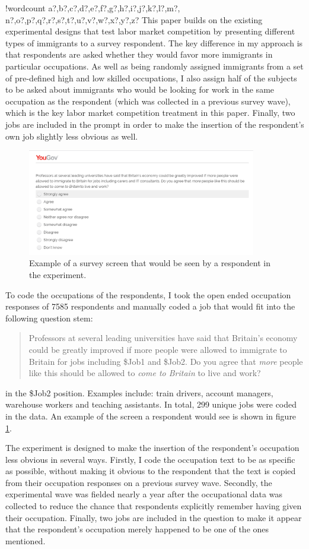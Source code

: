 \documentclass{article}\usepackage[]{graphicx}\usepackage[]{color}
\newcounter{words}
\newenvironment{counted}{%
\setcounter{words}{0}
\SearchList!{wordcount}{\stepcounter{words}}
{a?,b?,c?,d?,e?,f?,g?,h?,i?,j?,k?,l?,m?,
n?,o?,p?,q?,r?,s?,t?,u?,v?,w?,x?,y?,z?}
\UndoBoundary{'}
\SearchOrder{p;}}{%
\StopSearching}
\begin{document}
\begin{counted}
This paper builds on the existing experimental designs that test labor market competition by presenting different types of immigrants to a survey respondent. The key difference in my approach is that respondents are asked whether they would favor more immigrants in particular occupations. As well as being randomly assigned immigrants from a set of pre-defined high and low skilled occupations, I also assign half of the subjects to be asked about immigrants who would be looking for work in the same occupation as the respondent (which was collected in a previous survey wave), which is the key labor market competition treatment in this paper. Finally, two jobs are included in the prompt in order to make the insertion of the respondent's own job slightly less obvious as well.

\begin{figure}
\includegraphics[width=10cm]{figure/main_experment.png}
\caption{Example of a survey screen that would be seen by a respondent in the experiment.}
\label{fig:experimentScreen}
\end{figure}


To code the occupations of the respondents, I took the open ended occupation responses of 7585 respondents and manually coded a job that would fit into the following question stem:
\begin{quote}
Professors at several leading universities have said that Britain's economy could be greatly improved if more people were allowed to immigrate to Britain for jobs including \$Job1 and \$Job2. Do you agree that \textit{more} people like this should be allowed to \textit{come to Britain} to live and work?
\end{quote}
in the \$Job2 position. Examples include: train drivers, account managers, warehouse workers and teaching assistants. In total, 299 unique jobs were coded in the data. An example of the screen a respondent would see is shown in figure \ref{fig:experimentScreen}. 

The experiment is designed to make the insertion of the respondent's occupation less obvious in several ways. Firstly, I code the occupation text to be as specific as possible, without making it obvious to the respondent that the text is copied from their occupation responses on a previous survey wave. Secondly, the experimental wave was fielded nearly a year after the occupational data was collected to reduce the chance that respondents  explicitly remember having given their occupation. Finally, two jobs are included in the question to make it appear that the respondent's occupation merely happened to be one of the ones mentioned.


\end{counted}
\end{document}
